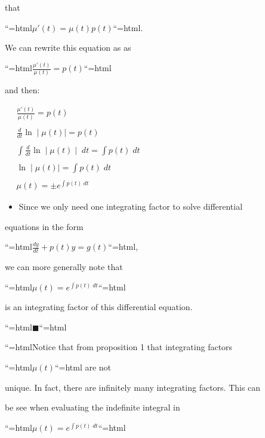     that

    ``{=html}$\mu ' (t) = \mu (t) p(t)$``{=html}.

    We can rewrite this equation as as

    ``{=html}$\frac{\mu '(t)}{\mu (t)} = p(t)$``{=html}

    and then:







$\begin{aligned} \quad \frac{ \mu '(t)}{ \mu (t)} = p(t) \\\\ \quad \frac{d}{dt} \ln \mid \mu (t) \mid = p(t) \\\\ \quad \int \frac{d}{dt} \ln \mid \mu (t) \mid \; dt = \int p(t) \; dt \\\\ \quad \ln \mid \mu (t) \mid = \int p(t) \; dt \\\\ \quad \mu (t) = \pm e^{\int p(t) \; dt} \end{aligned}$







\begin{itemize}
    \item Since we only need one integrating factor to solve differential
\end{itemize}
    equations in the form

    ``{=html}$\frac{dy}{dt} + p(t) y = g(t)$``{=html},

    we can more generally note that

    ``{=html}$\mu (t) = e^{\int p(t) \; dt}$``{=html}

    is an integrating factor of this differential equation.

    ``{=html}$\blacksquare$``{=html}



``{=html}Notice that from proposition 1 that integrating factors

``{=html}$\mu (t)$``{=html} are not

unique. In fact, there are infinitely many integrating factors. This can

be see when evaluating the indefinite integral in

``{=html}$\mu (t) = e^{\int p(t) \; dt}$``{=html}

